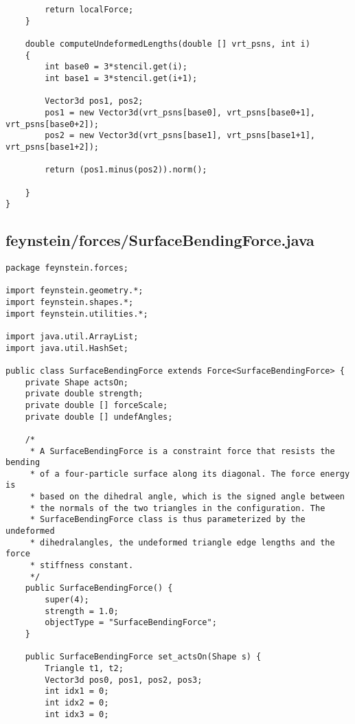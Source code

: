 \begin{lstlisting}
		return localForce;
	}
	
	double computeUndeformedLengths(double [] vrt_psns, int i)
	{
		int base0 = 3*stencil.get(i);
		int base1 = 3*stencil.get(i+1);
		
		Vector3d pos1, pos2;
		pos1 = new Vector3d(vrt_psns[base0], vrt_psns[base0+1], vrt_psns[base0+2]);
		pos2 = new Vector3d(vrt_psns[base1], vrt_psns[base1+1], vrt_psns[base1+2]);
		
		return (pos1.minus(pos2)).norm();
		
	}
}
\end{lstlisting}

\subsection*{feynstein/forces/SurfaceBendingForce.java}
\begin{lstlisting}
package feynstein.forces;

import feynstein.geometry.*;
import feynstein.shapes.*;
import feynstein.utilities.*;

import java.util.ArrayList;
import java.util.HashSet;

public class SurfaceBendingForce extends Force<SurfaceBendingForce> {
    private Shape actsOn;
    private double strength;
	private double [] forceScale;
	private double [] undefAngles;
	
	/*
	 * A SurfaceBendingForce is a constraint force that resists the bending
	 * of a four-particle surface along its diagonal. The force energy is
	 * based on the dihedral angle, which is the signed angle between
	 * the normals of the two triangles in the configuration. The
	 * SurfaceBendingForce class is thus parameterized by the undeformed
	 * dihedralangles, the undeformed triangle edge lengths and the force
	 * stiffness constant. 
	 */
    public SurfaceBendingForce() {
		super(4);
		strength = 1.0;
		objectType = "SurfaceBendingForce";
    }

    public SurfaceBendingForce set_actsOn(Shape s) {
		Triangle t1, t2;
		Vector3d pos0, pos1, pos2, pos3;
		int idx1 = 0;
		int idx2 = 0;
		int idx3 = 0;


\end{lstlisting}
